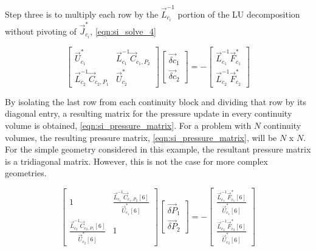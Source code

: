 Step three is to multiply each row by the $\vec{L}^{-1}_{c_i}$ portion of the LU decomposition without pivoting of $\vec{J}^{*}_{c_i}$, \eqref{eqn:si_solve_4}

  \begin{equation}
 \label{eqn:si_solve_4}
 \begin{bmatrix} 
 \vec{U}^{*}_{c_1} & \vec{L}^{-1}_{c_1}\vec{C}_{c_1,P_2} \\
 \vec{L}^{-1}_{c_2}\vec{C}_{c_2,P_1} & \vec{U}^{*}_{c_2}
 \end{bmatrix} \begin{bmatrix}
 \vec{\delta c}_{1} \\
 \vec{\delta c}_{2}
\end{bmatrix}  = -\begin{bmatrix}
 \vec{L}^{-1}_{c_1}\vec{F}^{*}_{c_1} \\
 \vec{L}^{-1}_{c_2}\vec{F}^{*}_{c_2}
\end{bmatrix}
 \end{equation}
 
By isolating the last row from each continuity block and dividing that row by its diagonal entry, a resulting matrix for the pressure update in every continuity volume is obtained, \eqref{eqn:si_pressure_matrix}. 
For a problem with $N$ continuity volumes, the resulting pressure matrix, \eqref{eqn:si_pressure_matrix}, will be $N$ x $N$.
For the simple geometry considered in this example, the resultant pressure matrix is a tridiagonal matrix.
However, this is not the case for more complex geometries.

  \begin{equation}
 \label{eqn:si_pressure_matrix}
 \begin{bmatrix} 
 1 & \frac{\vec{L}^{-1}_{c_1}\vec{C}_{c_1,P_2}[6]}{\vec{U}^{*}_{c_1}[6]} \\
 \frac{\vec{L}^{-1}_{c_2}\vec{C}_{c_2,P_1}[6]}{\vec{U}^{*}_{c_2}[6]} & 1
 \end{bmatrix} \begin{bmatrix}
 \vec{\delta P}_{1} \\
 \vec{\delta P}_{2}
\end{bmatrix}  = -\begin{bmatrix}
 \frac{\vec{L}^{-1}_{c_1}\vec{F}^{*}_{c_1}[6]}{\vec{U}^{*}_{c_1}[6]} \\
 \frac{\vec{L}^{-1}_{c_2}\vec{F}^{*}_{c_2}[6]}{\vec{U}^{*}_{c_2}[6]}
\end{bmatrix}
 \end{equation}
